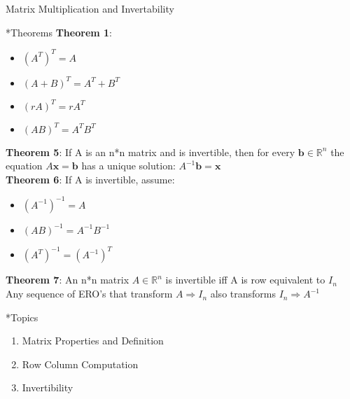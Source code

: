 \documentclass[a4paper, 12pt]{article}
\begin{document}
\newpage
\begin{section}{Matrix Multiplication and Invertability}
\begin{subsection}*{Theorems}
\textbf{Theorem 1}:
\begin{itemize}
\item{$(A^T)^T=A$}
\item{$(A+B)^T=A^T+B^T$}
\item{$(rA)^T=rA^T$}
\item{$(AB)^T=A^TB^T$}
\end{itemize} 
\textbf{Theorem 5}: If A is an n*n matrix and is invertible, then for 
every $\textbf{b}\in\mathbb{R}^n$ the equation $A\textbf{x}=\textbf{b}$
has a unique solution: $A^{-1}\textbf{b}=\textbf{x}$ \\
\noindent\textbf{Theorem 6}: If A is invertible, assume:
\begin{itemize}
\item{$(A^{-1})^{-1}=A$}
\item{$(AB)^{-1}=A^{-1}B^{-1}$}
\item{$(A^{T})^{-1}=(A^{-1})^{T}$}
\end{itemize}
\noindent\textbf{Theorem 7}: An n*n matrix $A\in\mathbb{R}^{n}$ is 
invertible iff A is row equivalent to $I_{n}$ \\
Any sequence of ERO's that transform $ A\Rightarrow I_{n}$ also 
transforms $I_{n} \Rightarrow A^{-1}$
\end{subsection} 
\begin{subsection}*{Topics}
\begin{enumerate}
\item{Matrix Properties and Definition}
\item{Row Column Computation}
\item{Invertibility}
\end{enumerate} \end{subsection}


\end{section}
\end{document}
